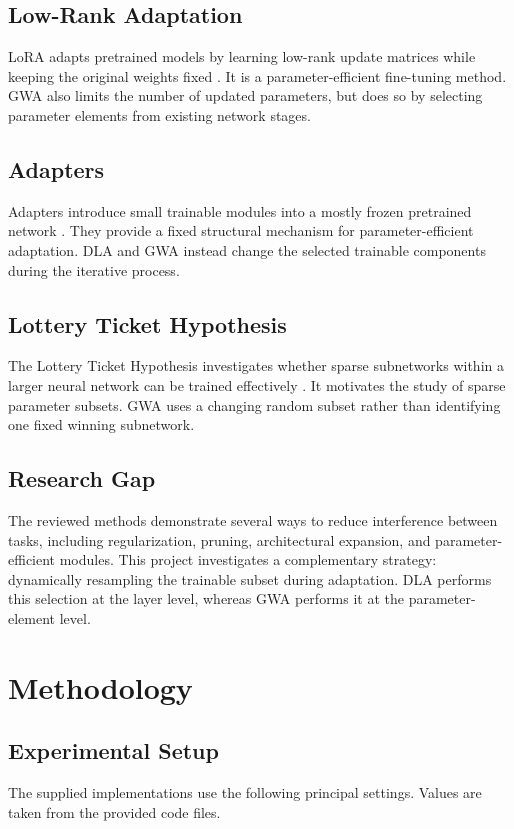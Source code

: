 \documentclass[12pt,a4paper]{report}
\begin{document}
\section{Low-Rank Adaptation}
LoRA adapts pretrained models by learning low-rank update matrices
while keeping the original weights fixed \cite{lora}. It is a
parameter-efficient fine-tuning method. GWA also limits the number of
updated parameters, but does so by selecting parameter elements from
existing network stages.

\section{Adapters}
Adapters introduce small trainable modules into a mostly frozen
pretrained network \cite{adapters}. They provide a fixed structural
mechanism for parameter-efficient adaptation. DLA and GWA instead
change the selected trainable components during the iterative process.

\section{Lottery Ticket Hypothesis}
The Lottery Ticket Hypothesis investigates whether sparse subnetworks
within a larger neural network can be trained effectively
\cite{lottery}. It motivates the study of sparse parameter subsets.
GWA uses a changing random subset rather than identifying one
fixed winning subnetwork.

\section{Research Gap}
The reviewed methods demonstrate several ways to reduce interference
between tasks, including regularization, pruning, architectural
expansion, and parameter-efficient modules. This project investigates
a complementary strategy: dynamically resampling the trainable subset
during adaptation. DLA performs this selection at the layer level,
whereas GWA performs it at the parameter-element level.

\chapter{Methodology}

\section{Experimental Setup}
The supplied implementations use the following principal settings.
Values are taken from the provided code files.
\end{document}
